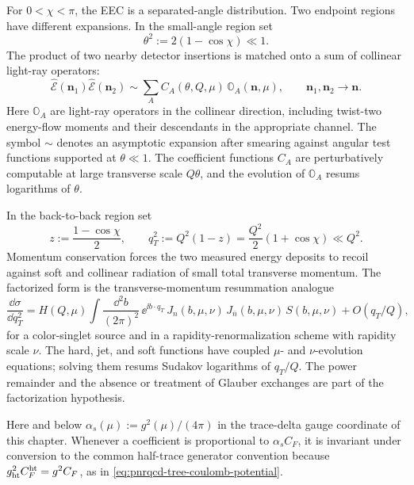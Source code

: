 For \(0<\chi<\pi\), the EEC is a separated-angle distribution.  Two endpoint
regions have different expansions.  In the small-angle region set
\[
  \theta^2:=2(1-\cos\chi)\ll1 .
\]
The product of two nearby detector insertions is matched onto a sum of
collinear light-ray operators:
\begin{equation}
  \widehat{\mathcal E}(\mathbf n_1)\widehat{\mathcal E}(\mathbf n_2)
  \sim
  \sum_A C_A(\theta,Q,\mu)\,
  \mathbb O_A(\mathbf n,\mu),
  \qquad
  \mathbf n_1,\mathbf n_2\to\mathbf n .
  \label{eq:qcd-eec-light-ray-ope-form}
\end{equation}
Here \(\mathbb O_A\) are light-ray operators in the collinear direction,
including twist-two energy-flow moments and their descendants in the
appropriate channel.  The symbol \(\sim\) denotes an asymptotic expansion
after smearing against angular test functions supported at
\(\theta\ll1\).  The coefficient functions \(C_A\) are perturbatively
computable at large transverse scale \(Q\theta\), and the evolution of
\(\mathbb O_A\) resums logarithms of \(\theta\).

In the back-to-back region set
\[
  z:=\frac{1-\cos\chi}{2},
  \qquad
  q_T^2:=Q^2(1-z)
  =
  \frac{Q^2}{2}(1+\cos\chi)\ll Q^2 .
\]
Momentum conservation forces the two measured energy deposits to recoil
against soft and collinear radiation of small total transverse momentum.  The
factorized form is the transverse-momentum resummation analogue
\begin{equation}
  \frac{\dd\sigma}{\dd q_T^2}
  =
  H(Q,\mu)
  \int \frac{\dd^2 b}{(2\pi)^2}\,
  \ee^{\ii b\cdot q_T}\,
  J_n(b,\mu,\nu)\,
  J_{\bar n}(b,\mu,\nu)\,
  S(b,\mu,\nu)
  +
  O(q_T/Q),
  \label{eq:qcd-eec-back-to-back-factorization}
\end{equation}
for a color-singlet source and in a rapidity-renormalization scheme with
rapidity scale \(\nu\).  The hard, jet, and soft functions have coupled
\(\mu\)- and \(\nu\)-evolution equations; solving them resums Sudakov
logarithms of \(q_T/Q\).  The power remainder and the absence or treatment of
Glauber exchanges are part of the factorization hypothesis.

Here and below \(\alpha_s(\mu):=g^2(\mu)/(4\pi)\) in the trace-delta gauge
coordinate of this chapter.  Whenever a coefficient is proportional to
\(\alpha_s C_F\), it is invariant under conversion to the common half-trace
generator convention because \(g_{\rm ht}^2C_F^{\rm ht}=g^2C_F\), as in
\eqref{eq:pnrqcd-tree-coulomb-potential}.

